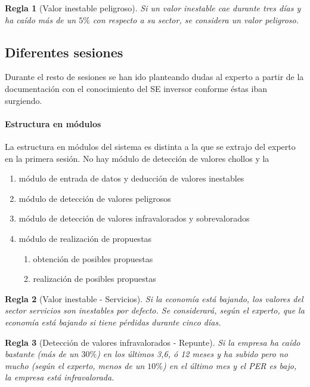 \documentclass[11pt,leqno]{article}
\theoremstyle{definition_wo_parentheses}
\theoremstyle{plain}
\newtheorem{regla}{Regla}[subsection]
\theoremstyle{remark}
\begin{document}
\begin{regla}[Valor inestable peligroso]
	Si un valor inestable cae durante tres días y ha caído más de un $5\%$ con respecto a su sector, se considera un valor peligroso.
\end{regla}

\subsection{Diferentes sesiones}

	Durante el resto de sesiones se han ido planteando dudas al experto a partir de la documentación con el conocimiento del SE inversor conforme éstas iban surgiendo.
	
\paragraph{Estructura en módulos} La estructura en módulos del sistema es distinta a la que se extrajo del experto en la primera sesión. No hay módulo de detección de valores chollos y la 

\begin{enumerate}
\item[0] módulo de entrada de datos y deducción de valores inestables
\item[1] módulo de detección de valores peligrosos
\item[2] módulo de detección de valores infravalorados y sobrevalorados
\item[3] módulo de realización de propuestas
	\begin{enumerate}[a]
		\item obtención de posibles propuestas
		\item realización de posibles propuestas
	\end{enumerate}
\end{enumerate}
	
\begin{regla}[Valor inestable - Servicios]
	Si la economía está bajando, los valores del sector servicios son inestables por defecto. Se considerará, según el experto, que la economía está bajando si tiene pérdidas durante cinco días. 
\end{regla}	

\begin{regla}[Detección de valores infravalorados - Repunte]
	Si la empresa ha caído bastante (más de un $30\%$) en los últimos 3,6, ó 12 meses y ha subido pero no mucho (según el experto, menos de un $10\%$) en el último mes y el PER es bajo, la empresa está infravalorada.
\end{regla}	
\end{document}
